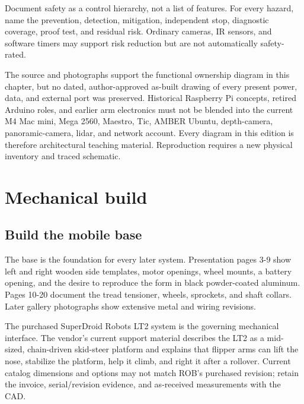 \documentclass[10pt,openany]{book}
\begin{document}
\begin{advancedbox}
Document safety as a control hierarchy, not a list of features. For every hazard, name the prevention, detection, mitigation, independent stop, diagnostic coverage, proof test, and residual risk. Ordinary cameras, IR sensors, and software timers may support risk reduction but are not automatically safety-rated.
\end{advancedbox}

\begin{fieldnotebox}[title={RECORD LIMIT: NOT AN AS-BUILT BLOCK DIAGRAM}]
The source and photographs support the functional ownership diagram in this chapter, but no dated, author-approved as-built drawing of every present power, data, and external port was preserved. Historical Raspberry Pi concepts, retired Arduino roles, and earlier arm electronics must not be blended into the current M4 Mac mini, Mega 2560, Maestro, Tic, AMBER Ubuntu, depth-camera, panoramic-camera, lidar, and network account. Every diagram in this edition is therefore architectural teaching material. Reproduction requires a new physical inventory and traced schematic.
\end{fieldnotebox}

\part{Mechanical build}


\chapter{Build the mobile base}

The base is the foundation for every later system. Presentation pages 3-9 show left and right wooden side templates, motor openings, wheel mounts, a battery opening, and the desire to reproduce the form in black powder-coated aluminum. Pages 10-20 document the tread tensioner, wheels, sprockets, and shaft collars. Later gallery photographs show extensive metal and wiring revisions.

The purchased SuperDroid Robots LT2 system is the governing mechanical interface. The vendor's current support material describes the LT2 as a mid-sized, chain-driven skid-steer platform and explains that flipper arms can lift the nose, stabilize the platform, help it climb, and right it after a rollover. Current catalog dimensions and options may not match ROB's purchased revision; retain the invoice, serial/revision evidence, and as-received measurements with the CAD.
\end{document}
